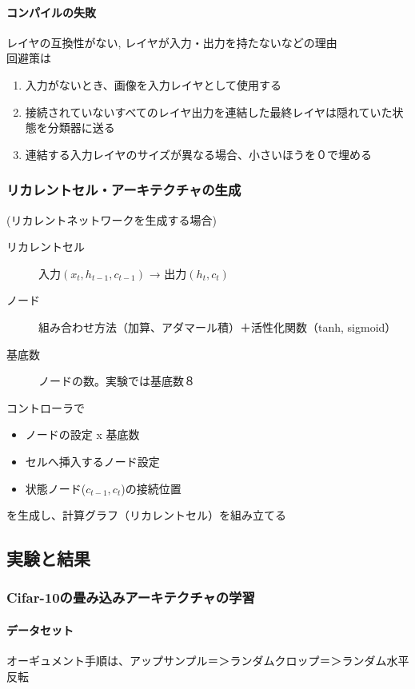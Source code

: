 \documentclass[twocolumn]{jarticle}     %
\begin{document}
\paragraph{コンパイルの失敗}
レイヤの互換性がない, レイヤが入力・出力を持たないなどの理由\\
回避策は
\begin{enumerate}
  \item 入力がないとき、画像を入力レイヤとして使用する
  \item 接続されていないすべてのレイヤ出力を連結した最終レイヤは隠れていた状態を分類器に送る
  \item 連結する入力レイヤのサイズが異なる場合、小さいほうを０で埋める
\end{enumerate}

\subsubsection{リカレントセル・アーキテクチャの生成}
(リカレントネットワークを生成する場合)
\begin{description}
  \item[リカレントセル] 入力$(x_t, h_{t-1}, c_{t-1})$ → 出力$(h_t, c_t)$
  \item[ノード] 組み合わせ方法（加算、アダマール積）＋活性化関数（tanh, sigmoid）
  \item[基底数] ノードの数。実験では基底数８
\end{description}

コントローラで
\begin{itemize}
  \item ノードの設定 x 基底数
  \item セルへ挿入するノード設定
  \item 状態ノード($c_{t-1}, c_t$)の接続位置
\end{itemize}
を生成し、計算グラフ（リカレントセル）を組み立てる


\subsection{実験と結果}
\subsubsection{Cifar-10の畳み込みアーキテクチャの学習}
\paragraph{データセット}
オーギュメント手順は、アップサンプル＝＞ランダムクロップ＝＞ランダム水平反転
\end{document}
